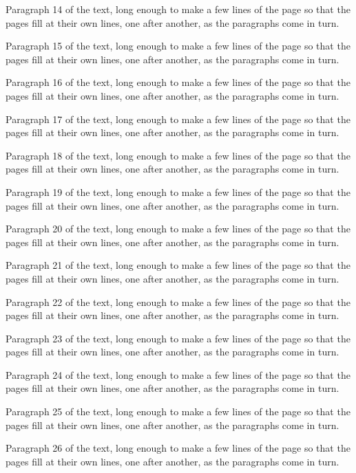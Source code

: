 \documentclass{article}
\begin{document}
Paragraph 14 of the text, long enough to make a few lines of the page so that the
pages fill at their own lines, one after another, as the paragraphs come in turn.

Paragraph 15 of the text, long enough to make a few lines of the page so that the
pages fill at their own lines, one after another, as the paragraphs come in turn.

Paragraph 16 of the text, long enough to make a few lines of the page so that the
pages fill at their own lines, one after another, as the paragraphs come in turn.

Paragraph 17 of the text, long enough to make a few lines of the page so that the
pages fill at their own lines, one after another, as the paragraphs come in turn.

Paragraph 18 of the text, long enough to make a few lines of the page so that the
pages fill at their own lines, one after another, as the paragraphs come in turn.

Paragraph 19 of the text, long enough to make a few lines of the page so that the
pages fill at their own lines, one after another, as the paragraphs come in turn.

Paragraph 20 of the text, long enough to make a few lines of the page so that the
pages fill at their own lines, one after another, as the paragraphs come in turn.

Paragraph 21 of the text, long enough to make a few lines of the page so that the
pages fill at their own lines, one after another, as the paragraphs come in turn.

Paragraph 22 of the text, long enough to make a few lines of the page so that the
pages fill at their own lines, one after another, as the paragraphs come in turn.

Paragraph 23 of the text, long enough to make a few lines of the page so that the
pages fill at their own lines, one after another, as the paragraphs come in turn.

Paragraph 24 of the text, long enough to make a few lines of the page so that the
pages fill at their own lines, one after another, as the paragraphs come in turn.

Paragraph 25 of the text, long enough to make a few lines of the page so that the
pages fill at their own lines, one after another, as the paragraphs come in turn.

Paragraph 26 of the text, long enough to make a few lines of the page so that the
pages fill at their own lines, one after another, as the paragraphs come in turn.
\end{document}
